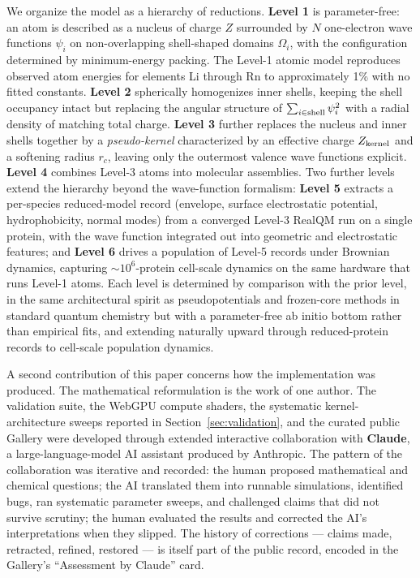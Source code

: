 \documentclass[11pt]{article}
\begin{document}
We organize the model as a hierarchy of reductions. \textbf{Level 1} is parameter-free: an atom is described as a nucleus of charge $Z$ surrounded by $N$ one-electron wave functions $\psi_i$ on non-overlapping shell-shaped domains $\Omega_i$, with the configuration determined by minimum-energy packing. The Level-1 atomic model reproduces observed atom energies for elements Li through Rn to approximately 1\% with no fitted constants. \textbf{Level 2} spherically homogenizes inner shells, keeping the shell occupancy intact but replacing the angular structure of $\sum_{i \in {\rm shell}} \psi_i^2$ with a radial density of matching total charge. \textbf{Level 3} further replaces the nucleus and inner shells together by a \emph{pseudo-kernel} characterized by an effective charge $Z_{\rm kernel}$ and a softening radius $r_c$, leaving only the outermost valence wave functions explicit. \textbf{Level 4} combines Level-3 atoms into molecular assemblies. Two further levels extend the hierarchy beyond the wave-function formalism: \textbf{Level 5} extracts a per-species reduced-model record (envelope, surface electrostatic potential, hydrophobicity, normal modes) from a converged Level-3 RealQM run on a single protein, with the wave function integrated out into geometric and electrostatic features; and \textbf{Level 6} drives a population of Level-5 records under Brownian dynamics, capturing $\sim 10^6$-protein cell-scale dynamics on the same hardware that runs Level-1 atoms. Each level is determined by comparison with the prior level, in the same architectural spirit as pseudopotentials and frozen-core methods in standard quantum chemistry but with a parameter-free ab initio bottom rather than empirical fits, and extending naturally upward through reduced-protein records to cell-scale population dynamics.

A second contribution of this paper concerns how the implementation was produced. The mathematical reformulation is the work of one author. The validation suite, the WebGPU compute shaders, the systematic kernel-architecture sweeps reported in Section~\ref{sec:validation}, and the curated public Gallery were developed through extended interactive collaboration with \textbf{Claude}, a large-language-model AI assistant produced by Anthropic. The pattern of the collaboration was iterative and recorded: the human proposed mathematical and chemical questions; the AI translated them into runnable simulations, identified bugs, ran systematic parameter sweeps, and challenged claims that did not survive scrutiny; the human evaluated the results and corrected the AI's interpretations when they slipped. The history of corrections --- claims made, retracted, refined, restored --- is itself part of the public record, encoded in the Gallery's ``Assessment by Claude'' card.
\end{document}
